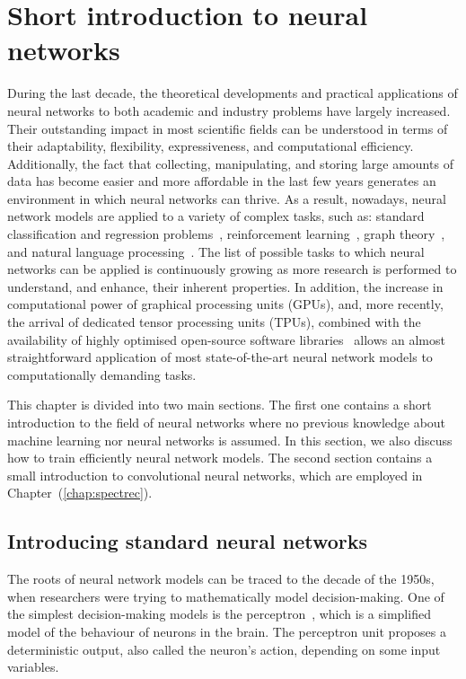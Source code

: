 \chapter{Short introduction to neural networks}\label{chap:neural_networks}
During the last decade, the theoretical developments and practical applications of neural networks to both
academic and industry problems have largely increased. Their outstanding impact in most scientific fields can
be understood in terms of their adaptability, flexibility, expressiveness, and computational efficiency.
Additionally, the fact that collecting, manipulating, and storing large amounts of data has become easier and
more affordable in the last few years generates an environment in which neural networks can thrive. As a
result, nowadays, neural network models are applied to a variety of complex tasks, such as: standard
classification and regression problems~\cite{wan1990neural, feraud2002methodology}, reinforcement
learning~\cite{ReinforcementOverview, ReinforcementOverview2}, graph theory~\cite{Wu_2021}, and natural
language processing~\cite{NLPIntro, NLPIntro2}. The list of possible tasks to which neural networks can be
applied is continuously growing as more research is performed to understand, and enhance, their inherent
properties. In addition, the increase in computational power of graphical processing units (GPUs), and, more
recently, the arrival of dedicated tensor processing units (TPUs), combined with the availability of highly
optimised open-source software libraries~\cite{PyTorch, Keras, tensorflow2015} allows an almost
straightforward application of most state-of-the-art neural network models to computationally demanding tasks.

This chapter is divided into two main sections. The first one contains a short introduction to the field of
neural networks where no previous knowledge about machine learning nor neural networks is assumed. In this
section, we also discuss how to train efficiently neural network models. The second section contains a small
introduction to convolutional neural networks, which are employed in Chapter~(\ref{chap:spectrec}).

\section{Introducing standard neural networks}
The roots of neural network models can be traced to the decade of the 1950s, when researchers were trying to
mathematically model decision-making. One of the simplest decision-making models is the
perceptron~\cite{rosenblatt1958perceptron}, which is a simplified model of the behaviour of neurons in the
brain. The perceptron unit proposes a deterministic output, also called the neuron's action, depending on some
input variables.

